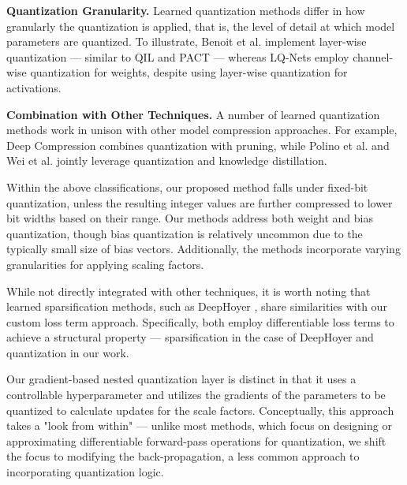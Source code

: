 \textbf{Quantization Granularity.} 
Learned quantization methods differ in how granularly the quantization is applied, 
that is, the level of detail at which model parameters are quantized. 
To illustrate, Benoit et al. \cite{jacob2018quantization} implement layer-wise quantization  — 
similar to QIL \cite{DBLP:conf/cvpr/JungSLSHKHC19} and PACT \cite{DBLP:journals/corr/abs-1805-06085}  — 
whereas LQ-Nets \cite{DBLP:conf/eccv/ZhangYYH18} employ channel-wise quantization for weights, 
despite using layer-wise quantization for activations.

\textbf{Combination with Other Techniques.} 
A number of learned quantization methods work in unison with other model compression approaches.
For example, Deep Compression \cite{han2016deepcompression} combines quantization with pruning, while 
Polino et al. \cite{polino2018modelcompression} and Wei et al. \cite{DBLP:conf/eccv/WeiPQOY18} 
jointly leverage quantization and knowledge distillation.

Within the above classifications, our proposed method falls under fixed-bit quantization, 
unless the resulting integer values are further compressed to lower bit widths based on their range. 
Our methods address both weight and bias quantization, 
though bias quantization is relatively uncommon due to the typically small size of bias vectors. 
Additionally, the methods incorporate varying granularities for applying scaling factors.

While not directly integrated with other techniques, 
it is worth noting that learned sparsification methods, 
such as DeepHoyer \cite{DBLP:conf/iclr/YangWL20}, 
share similarities with our custom loss term approach. 
Specifically, both employ differentiable loss terms to achieve a structural property —
sparsification in the case of DeepHoyer and quantization in our work.

Our gradient-based nested quantization layer is distinct in that 
it uses a controllable hyperparameter and utilizes 
the gradients of the parameters to be quantized 
to calculate updates for the scale factors. 
Conceptually, this approach takes a "look from within" — unlike most methods, 
which focus on designing or approximating differentiable 
forward-pass operations for quantization, 
we shift the focus to modifying the back-propagation, 
a less common approach to incorporating quantization logic.